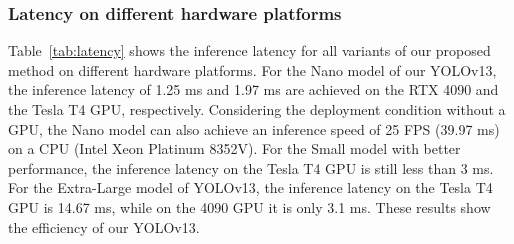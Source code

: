 \subsubsection{Latency on different hardware platforms} Table~\ref{tab:latency} shows the inference latency for all variants of our proposed method on different hardware platforms. For the Nano model of our YOLOv13, the inference latency of 1.25 ms and 1.97 ms are achieved on the RTX 4090 and the Tesla T4 GPU, respectively. Considering the deployment condition without a GPU, the Nano model can also achieve an inference speed of 25 FPS (39.97 ms) on a CPU (Intel Xeon Platinum 8352V). For the Small model with better performance, the inference latency on the Tesla T4 GPU is still less than 3 ms. For the Extra-Large model of YOLOv13, the inference latency on the Tesla T4 GPU is 14.67 ms, while on the 4090 GPU it is only 3.1 ms. These results show the efficiency of our YOLOv13.


